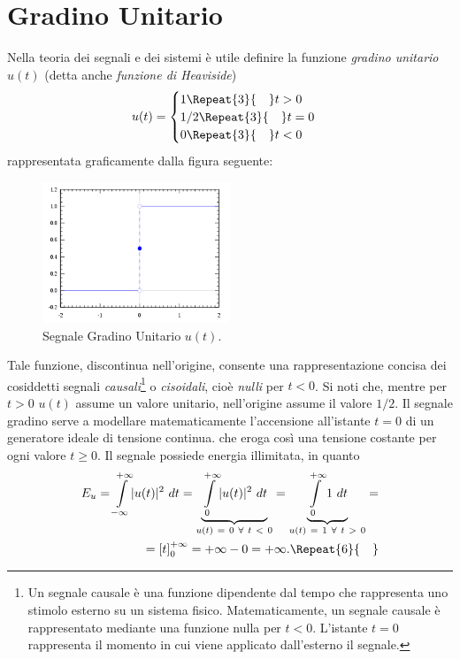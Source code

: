 \documentclass[12pt,oneside,openany]{memoir}
\numberwithin{equation}{subsection}
\DeclarePairedDelimiter{\abs}{\lvert}{\rvert}
\newcommand{\quads}[1]{\Repeat{#1}{\quad}}
\newcommand{\dt}{\ dt}
\begin{document}
\section{Gradino Unitario}
Nella teoria dei segnali e dei sistemi \`e utile definire la funzione
\textit{gradino unitario} $u(t)$ (detta anche \textit{funzione di Heaviside})
\begin{equation}
	u(t) =
		\begin{cases}
			1 \quads{3} t > 0\\
			1/2 \quads{3} t = 0\\
			0 \quads{3} t < 0
		\end{cases}
\end{equation}
rappresentata graficamente dalla figura seguente:
\begin{figure}[H]
\centering
\captionsetup{justification=centering}
\includegraphics[width=0.5\textwidth]{images/heaviside_function.png}
\caption{Segnale Gradino Unitario $u(t)$.}
\end{figure}
Tale funzione, discontinua nell'origine, consente una rappresentazione concisa
dei cosiddetti segnali \textit{causali}\footnote{Un segnale causale \`e una
funzione dipendente dal tempo che rappresenta uno stimolo esterno su un sistema
fisico. Matematicamente, un segnale causale \`e rappresentato mediante una
funzione nulla per $t < 0$. L'istante $t = 0$ rappresenta il momento in cui
viene applicato dall'esterno il segnale.} o \textit{cisoidali}, cio\`e
\textit{nulli} per $t < 0$. Si noti che, mentre per $t > 0$ $u(t)$ assume un
valore unitario, nell'origine assume il valore $1/2$.
\bigbreak
Il segnale gradino serve a modellare matematicamente l'accensione all'istante
$t = 0$ di un generatore ideale di tensione continua. che eroga cos\`i una
tensione costante per ogni valore $t \geq 0$. Il  segnale possiede energia
illimitata, in quanto
\begin{equation}
	\begin{split}
		E_u = \int\displaylimits_{-\infty}^{+\infty} \abs{u(t)}^2 \dt = \underbrace{\int\displaylimits_{0}^{+\infty} \abs{u(t)}^2 \dt}_{u(t) \ = \ 0 \ \forall \ t \ < \ 0} = \underbrace{\int\displaylimits_{0}^{+\infty} 1 \dt}_{u(t) \ = \ 1 \ \forall \ t \ > \ 0} =
		\\
		= \left[ t \right]_0^{+\infty} = +\infty - 0 = +\infty.
		\quads{6}
	\end{split}
\end{equation}
\end{document}

